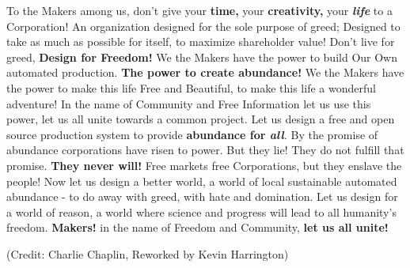 \documentclass{article}
\begin{document}
{To the Makers among us, don't give your \textbf{time,} your
\textbf{creativity,} your \emph{\textbf{life}} to a Corporation! An
organization designed for the sole purpose of greed; Designed to take as
much as possible for itself, to maximize shareholder value! Don't live
for greed, \textbf{Design for Freedom!} We the Makers have the power to
build Our Own automated production. \textbf{The power to create abundance!} We the Makers have the power to make this life Free and
Beautiful, to make this life a wonderful adventure! In the name of
Community and Free Information let us use this power, let us all unite
towards a common project. Let us design a free and open source
production system to provide \textbf{abundance for \emph{all}}\emph{.}
By the promise of abundance corporations have risen to power. But they
lie! They do not fulfill that promise. \textbf{They never will!} Free
markets free Corporations, but they enslave the people! Now let us
design a better world, a world of local sustainable automated abundance
- to do away with greed, with hate and domination. Let us design for a
world of reason, a world where science and progress will lead to all
humanity's freedom. \textbf{Makers!} in the name of Freedom and
Community, \textbf{let us all unite!}

(Credit: Charlie Chaplin, Reworked by Kevin Harrington)

}
\end{document}
